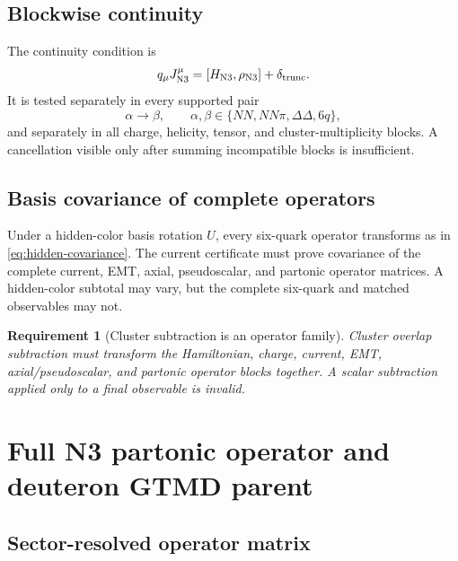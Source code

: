 \documentclass[11pt]{article}
\newtheorem{requirement}[definition]{Requirement}
\begin{document}
\subsection{Blockwise continuity}

The continuity condition is
\begin{equation}
 q_\mu J_{\rm N3}^{\mu}
 =[H_{\rm N3},\rho_{\rm N3}]
 +\delta_{\rm trunc}.
\label{eq:n3-continuity}
\end{equation}
It is tested separately in every supported pair
\begin{equation}
 \alpha\to\beta,
 \qquad
 \alpha,\beta\in\{NN,NN\pi,\Delta\Delta,6q\},
\label{eq:n3-block-pairs}
\end{equation}
and separately in all charge, helicity, tensor, and cluster-multiplicity blocks.  A cancellation visible only after summing incompatible blocks is insufficient.

\subsection{Basis covariance of complete operators}

Under a hidden-color basis rotation \(U\), every six-quark operator transforms as in \cref{eq:hidden-covariance}.  The current certificate must prove covariance of the complete current, EMT, axial, pseudoscalar, and partonic operator matrices.  A hidden-color subtotal may vary, but the complete six-quark and matched observables may not.

\begin{requirement}[Cluster subtraction is an operator family]
Cluster overlap subtraction must transform the Hamiltonian, charge, current, EMT, axial/pseudoscalar, and partonic operator blocks together.  A scalar subtraction applied only to a final observable is invalid.
\label{req:subtraction-family}
\end{requirement}

\section{Full N3 partonic operator and deuteron GTMD parent}
\label{sec:parent}

\subsection{Sector-resolved operator matrix}
\end{document}
